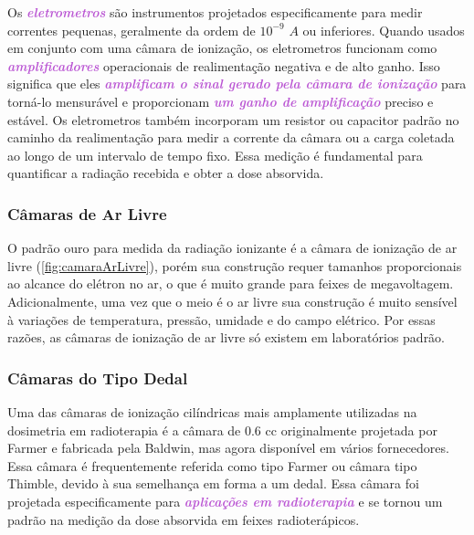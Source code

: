 \documentclass[11pt,a4paper]{article}
\begin{document}
	Os \textcolor{MediumOrchid}{\textit{\textbf{eletrometros}}} são instrumentos projetados especificamente para medir correntes pequenas, geralmente da ordem de $10^{-9}$ $A$ ou inferiores. Quando usados em conjunto com uma câmara de ionização, os eletrometros funcionam como \textcolor{MediumOrchid}{\textit{\textbf{amplificadores}}} operacionais de realimentação negativa e de alto ganho. Isso significa que eles \textcolor{MediumOrchid}{\textit{\textbf{amplificam o sinal gerado pela câmara de ionização}}} para torná-lo mensurável e proporcionam \textcolor{MediumOrchid}{\textit{\textbf{um ganho de amplificação}}} preciso e estável. Os eletrometros também incorporam um resistor ou capacitor padrão no caminho da realimentação para medir a corrente da câmara ou a carga coletada ao longo de um intervalo de tempo fixo. Essa medição é fundamental para quantificar a radiação recebida e obter a dose absorvida.
	

\subsubsection*{Câmaras de Ar Livre}
		
	O padrão ouro para medida da radiação ionizante é a câmara de ionização de ar livre (\ref{fig:camaraArLivre}), porém sua construção requer tamanhos proporcionais ao alcance do elétron no ar, o que é muito grande para feixes de megavoltagem. Adicionalmente, uma vez que o meio é o ar livre sua construção é muito sensível à variações de temperatura, pressão, umidade e do campo elétrico. Por essas razões, as câmaras de ionização de ar livre só existem em laboratórios padrão. 

\subsubsection*{Câmaras do Tipo Dedal}

	Uma das câmaras de ionização cilíndricas mais amplamente utilizadas na dosimetria em radioterapia é a câmara de 0.6 cc originalmente projetada por Farmer e fabricada pela Baldwin, mas agora disponível em vários fornecedores. Essa câmara é frequentemente referida como tipo Farmer ou câmara tipo Thimble, devido à sua semelhança em forma a um dedal. Essa câmara foi projetada especificamente para \textcolor{MediumOrchid}{\textit{\textbf{aplicações em radioterapia}}} e se tornou um padrão na medição da dose absorvida em feixes radioterápicos.
\end{document}
